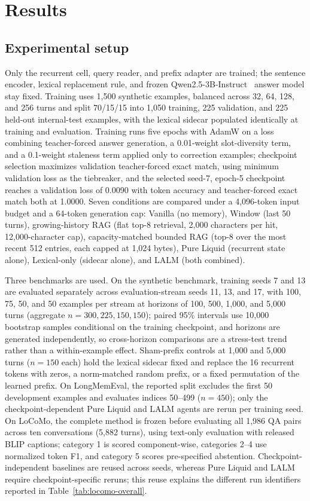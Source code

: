 \documentclass[conference]{IEEEtran}
\begin{document}
\section{Results}
\label{sec:results}
\subsection{Experimental setup}
\label{sec:setup}
Only the recurrent cell, query reader, and prefix adapter are trained; the sentence encoder, lexical replacement rule, and frozen Qwen2.5-3B-Instruct~\cite{yang2024qwen25} answer model stay fixed. Training uses 1,500 synthetic examples, balanced across 32, 64, 128, and 256 turns and split 70/15/15 into 1,050 training, 225 validation, and 225 held-out internal-test examples, with the lexical sidecar populated identically at training and evaluation. Training runs five epochs with AdamW on a loss combining teacher-forced answer generation, a 0.01-weight slot-diversity term, and a 0.1-weight staleness term applied only to correction examples; checkpoint selection maximizes validation teacher-forced exact match, using minimum validation loss as the tiebreaker, and the selected seed-7, epoch-5 checkpoint reaches a validation loss of 0.0090 with token accuracy and teacher-forced exact match both at 1.0000. Seven conditions are compared under a 4,096-token input budget and a 64-token generation cap: Vanilla (no memory), Window (last 50 turns), growing-history RAG (flat top-8 retrieval, 2,000 characters per hit, 12,000-character cap), capacity-matched bounded RAG (top-8 over the most recent 512 entries, each capped at 1,024 bytes), Pure Liquid (recurrent state alone), Lexical-only (sidecar alone), and LALM (both combined).

Three benchmarks are used. On the synthetic benchmark, training seeds 7 and 13 are evaluated separately across evaluation-stream seeds 11, 13, and 17, with 100, 75, 50, and 50 examples per stream at horizons of 100, 500, 1,000, and 5,000 turns (aggregate $n=300,225,150,150$); paired 95\% intervals use 10,000 bootstrap samples conditional on the training checkpoint, and horizons are generated independently, so cross-horizon comparisons are a stress-test trend rather than a within-example effect. Sham-prefix controls at 1,000 and 5,000 turns ($n=150$ each) hold the lexical sidecar fixed and replace the 16 recurrent tokens with zeros, a norm-matched random prefix, or a fixed permutation of the learned prefix. On LongMemEval, the reported split excludes the first 50 development examples and evaluates indices 50--499 ($n=450$); only the checkpoint-dependent Pure Liquid and LALM agents are rerun per training seed. On LoCoMo, the complete method is frozen before evaluating all 1,986 QA pairs across ten conversations (5,882 turns), using text-only evaluation with released BLIP captions; category 1 is scored component-wise, categories 2--4 use normalized token F1, and category 5 scores pre-specified abstention. Checkpoint-independent baselines are reused across seeds, whereas Pure Liquid and LALM require checkpoint-specific reruns; this reuse explains the different run identifiers reported in Table~\ref{tab:locomo-overall}.
\end{document}
